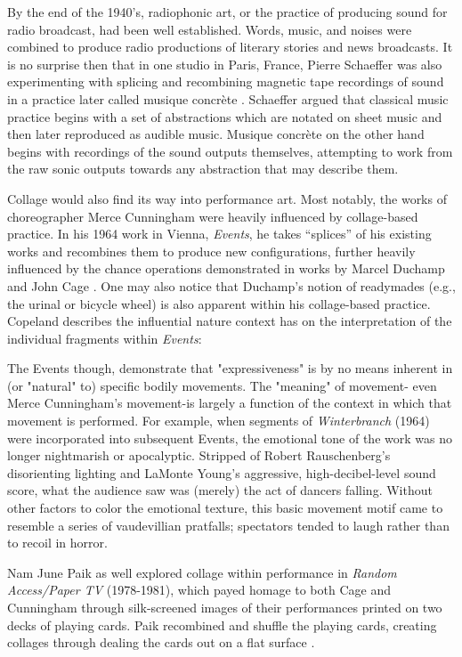 \documentclass[a4paper,10pt,final]{ThesisStyle}
\begin{document}
By the end of the 1940's, radiophonic art, or the practice of producing sound for radio broadcast, had been well established.  Words, music, and noises were combined to produce radio productions of literary stories and news broadcasts.  It is no surprise then that in one studio in Paris, France, Pierre Schaeffer was also experimenting with splicing and recombining magnetic tape recordings of sound in a practice later called musique concr\`ete \cite{}.  Schaeffer argued that classical music practice begins with a set of abstractions which are notated on sheet music and then later reproduced as audible music.  Musique concr\`ete on the other hand begins with recordings of the sound outputs themselves, attempting to work from the raw sonic outputs towards any abstraction that may describe them.  \cite{Augoyard2006}

Collage would also find its way into performance art.  Most notably, the works of choreographer Merce Cunningham were heavily influenced by collage-based practice.  In his 1964 work in Vienna, \textit{Events}, he takes ``splices'' of his existing works and recombines them to produce new configurations, further heavily influenced by the chance operations demonstrated in works by Marcel Duchamp and John Cage \cite{Copeland2002}.  One may also notice that Duchamp's notion of readymades (e.g., the urinal or bicycle wheel) is also apparent within his collage-based practice.  Copeland describes the influential nature context has on the interpretation of the individual fragments within \textit{Events}:
\begin{quotationb}
The Events though, demonstrate that "expressiveness" is by no means inherent in (or "natural" to) specific bodily movements. The "meaning" of movement- even Merce Cunningham's movement-is largely a function of the context in which that movement is performed. For example, when segments of \textit{Winterbranch} (1964) were incorporated into subsequent Events, the emotional tone of the work was no longer nightmarish or apocalyptic. Stripped of Robert Rauschenberg's disorienting lighting and LaMonte Young's aggressive, high-decibel-level sound score, what the audience saw was (merely) the act of dancers falling. Without other factors to color the emotional texture, this basic movement motif came to resemble a series of vaudevillian pratfalls; spectators tended to laugh rather than to recoil in horror.
\end{quotationb}
Nam June Paik as well explored collage within performance in \textit{Random Access/Paper TV} (1978-1981), which payed homage to both Cage and Cunningham through silk-screened images of their performances printed on two decks of playing cards.  Paik recombined and shuffle the playing cards, creating collages through dealing the cards out on a flat surface \cite{Copeland2002}.
\end{document}

